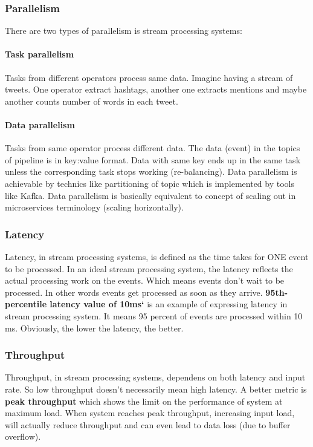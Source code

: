 \documentclass[a4]{report}
\begin{document}
    \subsubsection{Parallelism}
    There are two types of parallelism is stream processing systems:
    \paragraph{Task parallelism}
    Tasks from different operators process same data.
    Imagine having a stream of tweets.
    One operator extract hashtags, another one extracts mentions and maybe another counts number of words in each
    tweet.

    \paragraph{Data parallelism}
    Tasks from same operator process different data.
    The data (event) in the topics of pipeline is in key:value format.
    Data with same key ends up in the same task unless the corresponding task stops working (re-balancing).
    Data parallelism is achievable by technics like partitioning of topic which is implemented by tools like Kafka.
    Data parallelism is basically equivalent to concept of scaling out in microservices terminology (scaling
    horizontally).

    \subsubsection{Latency}
    Latency, in stream processing systems, is defined as the time takes for ONE event to be processed.
    In an ideal stream processing system, the latency reflects the actual processing work on the events.
    Which means events don't wait to be processed.
    In other words events get processed as soon as they arrive.
    \textbf{95th-percentile latency value of 10ms`} is an example of expressing latency in stream processing system.
    It means 95 percent of events are processed within 10 ms.
    Obviously, the lower the latency, the better.

    \subsubsection{Throughput}
    Throughput, in stream processing systems, dependens on both latency and input rate.
    So low throughput doesn't necessarily mean high latency.
    A better metric is \textbf{peak throughput} which shows the limit on the performance of system at maximum load.
    When system reaches peak throughput, increasing input load, will actually reduce throughput and can even lead to
    data loss (due to buffer overflow).
\end{document}
